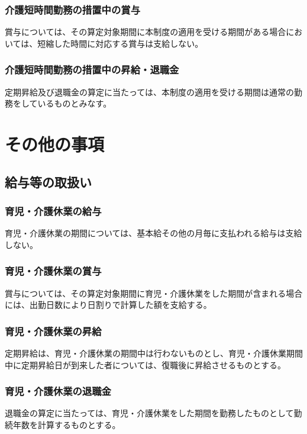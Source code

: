 \documentclass{jsarticle}
\begin{document}
\subsubsection{介護短時間勤務の措置中の賞与}
\label{育介_項_介護短時間勤務の措置中の賞与}
賞与については、その算定対象期間に本制度の適用を受ける期間がある場合においては、短縮した時間に対応する賞与は支給しない。

\subsubsection{介護短時間勤務の措置中の昇給・退職金}
\label{育介_項_介護短時間勤務の措置中の昇給・退職金}
定期昇給及び退職金の算定に当たっては、本制度の適用を受ける期間は通常の勤務をしているものとみなす。

\section{その他の事項}

\subsection{給与等の取扱い}
\label{育介_条_給与等の取扱い}

\subsubsection{育児・介護休業の給与}
\label{育介_項_育児・介護休業の給与}
育児・介護休業の期間については、基本給その他の月毎に支払われる給与は支給しない。

\subsubsection{育児・介護休業の賞与}
\label{育介_項_育児・介護休業の賞与}
賞与については、その算定対象期間に育児・介護休業をした期間が含まれる場合には、出勤日数により日割りで計算した額を支給する。

\subsubsection{育児・介護休業の昇給}
\label{育介_項_育児・介護休業の昇給}
定期昇給は、育児・介護休業の期間中は行わないものとし、育児・介護休業期間中に定期昇給日が到来した者については、復職後に昇給させるものとする。

\subsubsection{育児・介護休業の退職金}
\label{育介_項_育児・介護休業の退職金}
退職金の算定に当たっては、育児・介護休業をした期間を勤務したものとして勤続年数を計算するものとする。
\end{document}
